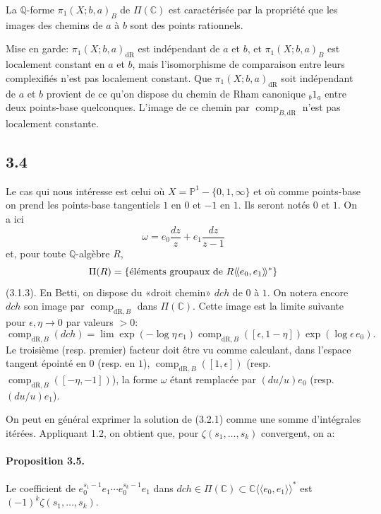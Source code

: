 \documentclass[10pt]{article}
\newcommand{\Q}{\mathbb Q}
\newcommand{\C}{\mathbb C}
\newcommand{\PP}{\mathbb P}
\newcommand{\comp}{\operatorname{comp}}
\newcommand{\dR}{\mathrm{dR}}
\begin{document}
La $\Q$-forme $\pi_1(X;b,a)_B$ de $\Pi(\C)$ est caractérisée par la propriété que les images des chemins de $a$ à $b$ sont des points rationnels.

Mise en garde: $\pi_1(X;b,a)_{\dR}$ est indépendant de $a$ et $b$, et $\pi_1(X;b,a)_B$ est localement constant en $a$ et $b$, mais l'isomorphisme de comparaison entre leurs complexifiés n'est pas localement constant. Que $\pi_1(X;b,a)_{\dR}$ soit indépendant de $a$ et $b$ provient de ce qu'on dispose du chemin de Rham canonique ${}_b1_a$ entre deux points-base quelconques. L'image de ce chemin par $\comp_{B,\dR}$ n'est pas localement constante.

\subsection*{3.4}
Le cas qui nous intéresse est celui où $X=\PP^1-\{0,1,\infty\}$ et où comme points-base on prend les points-base tangentiels $1$ en $0$ et $-1$ en $1$. Ils seront notés $0$ et $1$. On a ici
\[
 \omega=e_0\frac{dz}{z}+e_1\frac{dz}{z-1}
\]
et, pour toute $\Q$-algèbre $R$,
\[
\Pi(R)=\{\hbox{éléments groupaux de }R\langle\!\langle e_0,e_1\rangle\!\rangle^*\}
\]
(3.1.3). En Betti, on dispose du «droit chemin» $dch$ de $0$ à $1$. On notera encore $dch$ son image par $\comp_{\dR,B}$ dans $\Pi(\C)$. Cette image est la limite suivante pour $\epsilon,\eta\to0$ par valeurs $>0$:
\begin{equation}
\comp_{\dR,B}(dch)=\lim\exp(-\log\eta\,e_1)\comp_{\dR,B}([\epsilon,1-\eta])\exp(\log\epsilon\,e_0).
\tag{3.4.1}
\end{equation}
Le troisième (resp. premier) facteur doit être vu comme calculant, dans l'espace tangent épointé en $0$ (resp. en $1$), $\comp_{\dR,B}([1,\epsilon])$ (resp. $\comp_{\dR,B}([-\eta,-1])$), la forme $\omega$ étant remplacée par $(du/u)e_0$ (resp. $(du/u)e_1$).

On peut en général exprimer la solution de (3.2.1) comme une somme d'intégrales itérées. Appliquant 1.2, on obtient que, pour $\zeta(s_1,\ldots,s_k)$ convergent, on a:

\paragraph{Proposition 3.5.}
Le coefficient de $e_0^{s_1-1}e_1\cdots e_0^{s_k-1}e_1$ dans $dch\in\Pi(\C)\subset\C\langle\!\langle e_0,e_1\rangle\!\rangle^*$ est $(-1)^k\zeta(s_1,\ldots,s_k)$.
\end{document}
